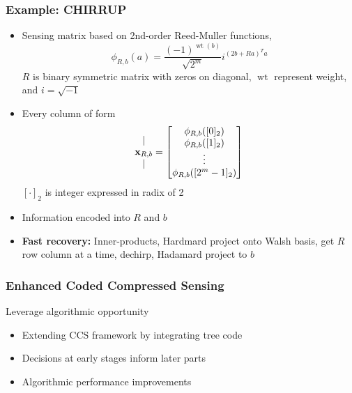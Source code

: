 \begin{frame}
\frametitle{Example: CHIRRUP}
\begin{itemize}
\item Sensing matrix based on 2nd-order Reed-Muller functions,
\begin{equation*}
\phi_{R,b} (a) = \frac{(-1)^{\operatorname{wt}(b)}}{\sqrt{2^m}}
i^{(2b + Ra)^T a}
\end{equation*}
$R$ is binary symmetric matrix with zeros on diagonal, $\operatorname{wt}$ represent weight, and $i = \sqrt{-1}$
\item Every column of form
\begin{equation*}
\begin{matrix} | \\ \mathbf{x}_{R,b} \\ | \end{matrix}
  = \begin{bmatrix}
  \phi_{R,b} ([0]_2) \\
  \phi_{R,b} ([1]_2) \\ \vdots \\
  \phi_{R,b} ([2^m-1]_2)
  \end{bmatrix}
\end{equation*}
$[ \cdot ]_2$ is integer expressed in radix of 2
\item Information encoded into $R$ and $b$
\item \textbf{Fast recovery:} Inner-products, Hardmard project onto Walsh basis, get $R$ row column at a time, dechirp, Hadamard project to $b$
\end{itemize}
\end{frame}
 

\begin{frame}
\frametitle{Enhanced Coded Compressed Sensing}
\begin{center}
\end{center}
\vfill
\begin{block}{Leverage algorithmic opportunity}
  \begin{itemize}
  \item Extending CCS framework by integrating tree code
  \item Decisions at early stages inform later parts 
  \item Algorithmic performance improvements
  \end{itemize}
\end{block}
\end{frame}

